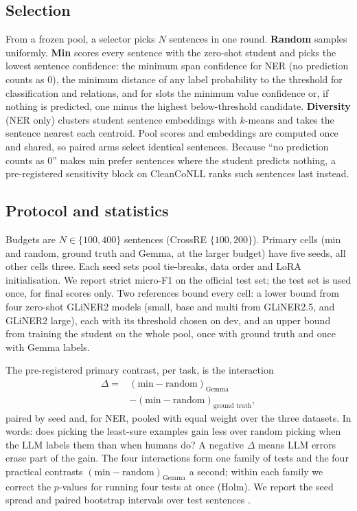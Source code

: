 \documentclass[11pt]{article}
\begin{document}
\subsection{Selection}

From a frozen pool, a selector picks $N$ sentences in one round. \textbf{Random} samples uniformly. \textbf{Min} scores every sentence with the zero-shot student and picks the lowest sentence confidence: the minimum span confidence for NER (no prediction counts as 0), the minimum distance of any label probability to the threshold for classification and relations, and for slots the minimum value confidence or, if nothing is predicted, one minus the highest below-threshold candidate. \textbf{Diversity} (NER only) clusters student sentence embeddings with $k$-means and takes the sentence nearest each centroid. Pool scores and embeddings are computed once and shared, so paired arms select identical sentences. Because ``no prediction counts as 0'' makes min prefer sentences where the student predicts nothing, a pre-registered sensitivity block on CleanCoNLL ranks such sentences last instead.

\subsection{Protocol and statistics}

Budgets are $N \in \{100, 400\}$ sentences (CrossRE $\{100, 200\}$). Primary cells (min and random, ground truth and Gemma, at the larger budget) have five seeds, all other cells three. Each seed sets pool tie-breaks, data order and LoRA initialisation. We report strict micro-F1 on the official test set; the test set is used once, for final scores only. Two references bound every cell: a lower bound from four zero-shot GLiNER2 models (small, base and multi from GLiNER2.5, and GLiNER2 large), each with its threshold chosen on dev, and an upper bound from training the student on the whole pool, once with ground truth and once with Gemma labels.

The pre-registered primary contrast, per task, is the interaction
\begin{align*}
\Delta = {} & (\text{min} - \text{random})_{\text{Gemma}} \\
& - (\text{min} - \text{random})_{\text{ground truth}},
\end{align*}
paired by seed and, for NER, pooled with equal weight over the three datasets. In words: does picking the least-sure examples gain less over random picking when the LLM labels them than when humans do? A negative $\Delta$ means LLM errors erase part of the gain. The four interactions form one family of tests and the four practical contrasts $(\text{min} - \text{random})_{\text{Gemma}}$ a second; within each family we correct the $p$-values for running four tests at once (Holm). We report the seed spread and paired bootstrap intervals over test sentences \citep{dror2018hitchhiker}.
\end{document}
